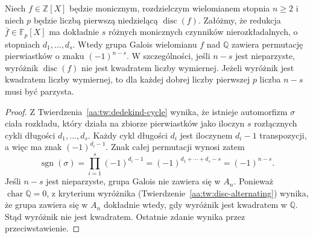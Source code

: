 \begin{wniosek}
\label{aa:wn:frob-parity}
Niech $f\in\mathbb Z[X]$ będzie monicznym, rozdzielczym
wielomianem stopnia $n\ge2$ i niech $p$ będzie liczbą pierwszą
niedzielącą $\operatorname{disc}(f)$. Załóżmy, że redukcja
$\bar f\in\mathbb F_p[X]$ ma dokładnie $s$ różnych monicznych
czynników nierozkładalnych, o stopniach $d_1,\ldots,d_s$.
Wtedy grupa Galois wielomianu $f$ nad $\mathbb Q$ zawiera
permutację pierwiastków o znaku $(-1)^{n-s}$. W szczególności,
jeśli $n-s$ jest nieparzyste, wyróżnik $\operatorname{disc}(f)$
nie jest kwadratem liczby wymiernej. Jeżeli wyróżnik jest kwadratem
liczby wymiernej, to dla każdej dobrej liczby pierwszej $p$
liczba $n-s$ musi być parzysta.
\end{wniosek}
\begin{proof}
Z Twierdzenia~\ref{aa:tw:dedekind-cycle} wynika, że istnieje
automorfizm $\sigma$ ciała rozkładu, który działa na zbiorze
pierwiastków jako iloczyn $s$ rozłącznych cykli długości
$d_1,\ldots,d_s$. Każdy cykl długości $d_i$ jest iloczynem
$d_i-1$ transpozycji, a więc ma znak $(-1)^{d_i-1}$.
Znak całej permutacji wynosi zatem
\[
 \operatorname{sgn}(\sigma)=\prod_{i=1}^s(-1)^{d_i-1}
 =(-1)^{d_1+\cdots+d_s-s}=(-1)^{n-s}.
\]
Jeśli $n-s$ jest nieparzyste, grupa Galois nie zawiera się
w $A_n$. Ponieważ $\operatorname{char}\mathbb Q=0$, z kryterium wyróżnika
(Twierdzenie~\ref{aa:tw:disc-alternating}) wynika, że grupa
zawiera się w $A_n$ dokładnie wtedy,
gdy wyróżnik jest kwadratem w $\mathbb Q$.
Stąd wyróżnik nie jest kwadratem. Ostatnie zdanie wynika
przez przeciwstawienie.
\end{proof}

